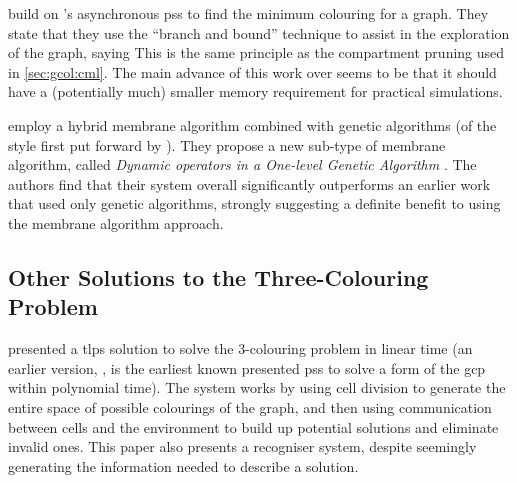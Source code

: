 
\citeauthor{Umetsu2019} \cite{Umetsu2019} build on \cite{Tanaka2012}'s asynchronous \glspl{ps} to find the minimum colouring for a graph.  They state that they use the ``branch and bound'' technique to assist in the exploration of the graph, saying   This is the same principle as the \gls{compartment} pruning used in \cref{sec:gcol:cml}.  The main advance of this work over \cite{Tanaka2012} seems to be that it should have a (potentially much) smaller memory requirement for practical simulations.


\citeauthor{Andreu-Guzman2020} \cite{Andreu-Guzman2020} employ a hybrid membrane algorithm combined with genetic algorithms (of the style first put forward by \citeauthor{Nishida2006} \cite{Nishida2006}).  They propose a new sub-type of membrane algorithm, called \emph{Dynamic operators in a One-level Genetic Algorithm }.  The authors find that their system overall significantly outperforms an earlier work that used only genetic algorithms, strongly suggesting a definite benefit to using the membrane algorithm approach.


\subsection{\label{sec:gcol:3colsol}Other Solutions to the Three-Colouring Problem}


\citeauthor{Diaz-Pernil2008} \cite{Diaz-Pernil2008} presented a \gls{tlps} solution to solve the 3-colouring problem in linear time (an earlier version, \cite{Diaz-Pernil2007}, is the earliest known presented \glspl{ps} to solve a form of the \gls{gcp} within polynomial time).  The system works by using cell division to generate the entire space of possible colourings of the graph, and then using communication between cells and the environment to build up potential solutions and eliminate invalid ones.  This paper also presents a recogniser system, despite seemingly generating the information needed to describe a solution.

